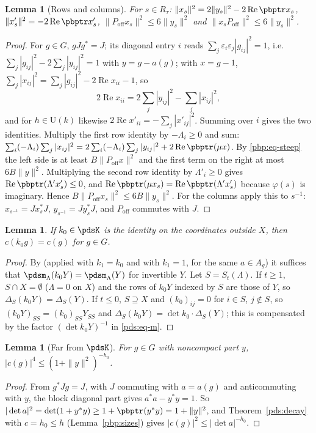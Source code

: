 \documentclass[10pt]{amsart}
\newtheorem{lemma}[theorem]{Lemma}
\theoremstyle{definition}
\theoremstyle{remark}
\newcommand{\Rel}{\operatorname{Re}}
\providecommand{\auU}{\mathrm U}
\begin{document}
\begin{lemma}[Rows and columns]\label{pbp:rows}
For $s\in R_\tau$: $\|x_s\|^2=2\|y_s\|^2-2\Rel\pbptr x_s$, $\|x'_s\|^2=-2\Rel\pbptr x'_s$,
$\|P_{\mathrm{off}}x_s\|^2\le6\|y_s\|^2$ and $\|x_sP_{\mathrm{off}}\|^2\le6\|y_s\|^2$.
\end{lemma}
\begin{proof}
For $g\in G$, $gJg^*=J$; its diagonal entry $i$ reads $\sum_j\varepsilon_i\varepsilon_j|g_{ij}|^2=1$, i.e.\
$\sum_j|g_{ij}|^2-2\sum_j|y_{ij}|^2=1$ with $y=g-a(g)$; with $x=g-1$, $\sum_j|x_{ij}|^2=\sum_j|g_{ij}|^2-
2\Rel x_{ii}-1$, so
\[
2\Rel x_{ii}=2\textstyle\sum_j|y_{ij}|^2-\sum_j|x_{ij}|^2 ,
\]
and for $h\in\auU(k)$ likewise $2\Rel x'_{ii}=-\sum_j|x'_{ij}|^2$. Summing over $i$ gives the two
identities. Multiply the first row identity by $-\Lambda_i\ge0$ and sum: $\sum_i(-\Lambda_i)\sum_j
|x_{ij}|^2=2\sum_i(-\Lambda_i)\sum_j|y_{ij}|^2+2\Rel\pbptr(\mu x)$. By \eqref{pbp:eq-steep} the left side is
at least $B\|P_{\mathrm{off}}x\|^2$ and the first term on the right at most $6B\|y\|^2$. Multiplying the
second row identity by $\Lambda'_i\ge0$ gives $\Rel\pbptr(\Lambda'x'_s)\le0$, and $\Rel\pbptr(\mu x_s)=
\Rel\pbptr(\Lambda'x'_s)$ because $\varphi(s)$ is imaginary. Hence $B\|P_{\mathrm{off}}x_s\|^2\le6B
\|y_s\|^2$. For the columns apply this to $s^{-1}$: $x_{s^{-1}}=Jx_s^*J$, $y_{s^{-1}}=Jy_s^*J$, and
$P_{\mathrm{off}}$ commutes with $J$.
\end{proof}

\begin{lemma}\label{pbp:leftX}
If $k_0\in\pdsK$ is the identity on the coordinates outside $X$, then $c(k_0g)=c(g)$ for $g\in G$.
\end{lemma}
\begin{proof}
By {\cite[(17)]{P49}} (applied with $k_1=k_0$ and with $k_1=1$, for the same $a\in A_g$) it suffices
that $\pdsm_\Lambda(k_0Y)=\pdsm_\Lambda(Y)$ for invertible $Y$. Let $S=S_t(\Lambda)$. If $t\ge1$, $S\cap X=
\emptyset$ ($\Lambda=0$ on $X$) and the rows of $k_0Y$ indexed by $S$ are those of $Y$, so $\Delta_S(k_0Y)
=\Delta_S(Y)$. If $t\le0$, $S\supseteq X$ and $(k_0)_{ij}=0$ for $i\in S$, $j\notin S$, so $(k_0Y)_{SS}=
(k_0)_{SS}Y_{SS}$ and $\Delta_S(k_0Y)=\det k_0\cdot\Delta_S(Y)$; this is compensated by the factor
$(\det k_0Y)^{-1}$ in \eqref{pds:eq-m}.
\end{proof}

\begin{lemma}[Far from $\pdsK$]\label{pbp:far}
For $g\in G$ with noncompact part $y$, $|c(g)|^4\le(1+\|y\|^2)^{-h_0}$.
\end{lemma}
\begin{proof}
From $g^*Jg=J$, with $J$ commuting with $a=a(g)$ and anticommuting with $y$, the block diagonal part
gives $a^*a-y^*y=1$. So $|\det a|^2=\det(1+y^*y)\ge1+\pbptr(y^*y)=1+\|y\|^2$, and
Theorem~\ref{pds:decay} with $c=h_0\le h$ (Lemma~\ref{pbp:sizes}) gives $|c(g)|^2\le|\det a|^{-h_0}$.
\end{proof}
\end{document}
